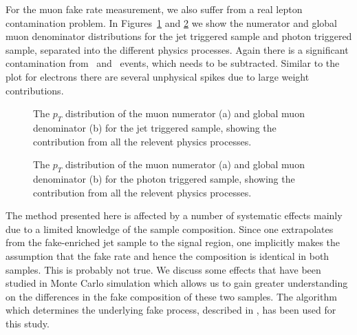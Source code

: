\documentclass{cmspaper}
\begin{document}
\label{sec:signalcontamination_muon}

For the muon fake rate measurement, we also suffer from a real lepton contamination problem. In Figures~\ref{fig:muonNumeratorDenominatorStacked_JetTriggeredSampleSeparate} and \ref{fig:muonNumeratorDenominatorStacked_PhotonTriggeredSampleSeparate} we show the numerator and global muon denominator distributions for the jet triggered sample and photon triggered sample, separated into the different physics processes. Again there is a significant contamination from \WPM\ and \Z\ events, which needs to be subtracted. Similar to the plot for electrons there are several unphysical spikes due to large weight contributions.

\begin{figure}[htb]
  \begin{center}
    
    \caption{The $p_T$ distribution of the muon numerator (a) and global muon denominator (b) for the jet triggered sample, showing the contribution from all the relevent physics processes.}
    \label{fig:muonNumeratorDenominatorStacked_JetTriggeredSampleSeparate}
  \end{center}
\end{figure}


\begin{figure}[htb]
  \begin{center}
    
    \caption{The $p_T$ distribution of the muon numerator (a) and global muon denominator (b) for the photon triggered sample, showing the contribution from all the relevent physics processes.}
    \label{fig:muonNumeratorDenominatorStacked_PhotonTriggeredSampleSeparate}
  \end{center}
\end{figure}

The method presented here is affected by a number of systematic effects mainly due to a limited knowledge of the sample composition. Since one extrapolates from the fake-enriched jet sample to the signal region, one implicitly makes the assumption that the fake rate and hence the composition is identical in both samples. This is probably not true. We discuss some effects that have been studied in Monte Carlo simulation which allows us to gain greater understanding on the differences in the fake composition of these two samples. The algorithm which determines the underlying fake process, described in , has been used for this study.
\end{document}

